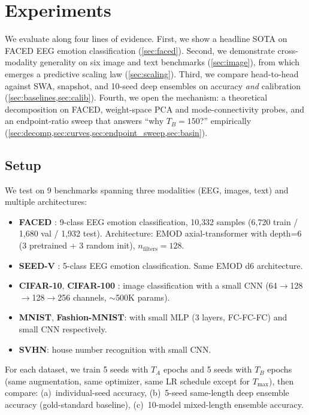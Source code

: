 \section{Experiments}
\label{sec:experiments}

We evaluate \ours{} along four lines of evidence. First, we show a
headline SOTA on FACED EEG emotion classification
(\cref{sec:faced}). Second, we demonstrate cross-modality generality on
six image and text benchmarks (\cref{sec:image}), from which emerges a
predictive scaling law
(\cref{sec:scaling}). Third, we compare head-to-head against SWA,
snapshot, and 10-seed deep ensembles on accuracy \emph{and} calibration
(\cref{sec:baselines,sec:calib}). Fourth, we open the mechanism: a
theoretical decomposition on FACED, weight-space PCA and
mode-connectivity probes, and an endpoint-ratio sweep that answers
``why $T_B=150$?'' empirically
(\cref{sec:decomp,sec:curves,sec:endpoint_sweep,sec:basin}).

\subsection{Setup}

We test \ours{} on 9 benchmarks spanning three modalities (EEG, images,
text) and multiple architectures:

\begin{itemize}[leftmargin=*]
\item \textbf{FACED} \cite{liu2024faced}: 9-class EEG emotion classification,
10{,}332 samples (6{,}720 train / 1{,}680 val / 1{,}932 test).
Architecture: EMOD axial-transformer with depth=6 (3 pretrained +
3 random init), $n_\mathrm{filters}=128$.
\item \textbf{SEED-V} \cite{zheng2019investigating}: 5-class EEG emotion
classification. Same EMOD d6 architecture.
\item \textbf{CIFAR-10}, \textbf{CIFAR-100} \cite{krizhevsky2009learning}:
image classification with a small CNN (64$\to$128$\to$128$\to$256 channels,
$\sim$500K params).
\item \textbf{MNIST}, \textbf{Fashion-MNIST}: with small MLP (3 layers,
FC-FC-FC) and small CNN respectively.
\item \textbf{SVHN}: house number recognition with small CNN.
\end{itemize}

For each dataset, we train 5 seeds with $T_A$ epochs and 5 seeds with
$T_B$ epochs (same augmentation, same optimizer, same LR schedule except
for $T_\mathrm{max}$), then compare:
(a)~individual-seed accuracy,
(b)~5-seed same-length deep ensemble accuracy (gold-standard baseline),
(c)~10-model mixed-length \ours{} ensemble accuracy.

